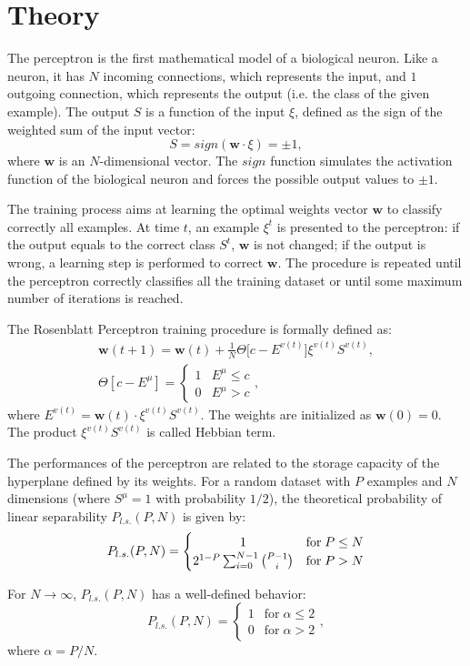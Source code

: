 \section{Theory}
\label{sec:fundamentals}

The perceptron is the first mathematical model of a biological neuron.
Like a neuron, it has $N$ incoming connections, which represents the input, and $1$ outgoing connection, which represents the output (i.e. the class of the given example).
The output $S$ is a function of the input $\xi$, defined as the sign of the weighted sum of the input vector:
\begin{equation}
    S = sign(\mathsf{\bm{w}} \cdotp \xi) = \pm 1,
    \label{eq:perceptron-activation}
\end{equation}
where $\mathsf{\bm{w}}$ is an $N$-dimensional vector.
The $sign$ function simulates the activation function of the biological neuron and forces the possible output values to $\pm 1$.

The training process aims at learning the optimal weights vector $\mathsf{\bm{w}}$ to classify correctly all examples.
At time $t$, an example $\xi^t$ is presented to the perceptron:
if the output equals to the correct class $S^t$, $\mathsf{\bm{w}}$ is not changed;
if the output is wrong, a learning step is performed to correct $\mathsf{\bm{w}}$.
The procedure is repeated until the perceptron correctly classifies all the training dataset or until some maximum number of iterations is reached.

The Rosenblatt Perceptron training procedure is formally defined as:
\begin{gather}
    \label{eq:perceptron-weight-update}
    \mathsf{\bm{w}}(t+1) = \mathsf{\bm{w}}(t) + \frac{1}{N} \Theta \big[c - E^{v(t)}\big] \xi^{v(t)} S^{v(t)}, \\
    \Theta[c - E^{\mu}] =  \begin{cases} \label{eq:heaviside-fun}
        1 & E^{\mu} \leq c \\
        0 & E^{\mu} > c
    \end{cases},
\end{gather}
where $E^{v(t)} = \mathsf{\bm{w}}(t) \cdot \xi^{v(t)} S^{v(t)}$.
The weights are initialized as $\mathsf{\bm{w}}(0) = 0$.
The product $\xi^{v(t)} S^{v(t)}$ is called Hebbian term.

The performances of the perceptron are related to the storage capacity of the hyperplane defined by its weights.
For a random dataset with $P$ examples and $N$ dimensions (where $S^\mu = 1$ with probability $1/2$), the theoretical probability of linear separability $P_{l.s.}(P,N)$ is given by:
\begin{equation}
    P_{l.s.}(P,N) =
    \begin{cases}
        \hfil 1 & \text{for} \; P \leq N \\
        2^{1-P} \sum^{N-1}_{i=0} \binom{P - 1}{i} & \text{for} \; P > N       
    \end{cases}
    \label{eq:prob-lin-sep}
\end{equation}

For $N \rightarrow \infty$, $P_{l.s.}(P,N)$ has a well-defined behavior:
\begin{equation} \label{eq:prob-lin-sep-alpha}
    P_{l.s.}(P,N) =
    \begin{cases}
        1 & \text{for} \; \alpha \leq 2 \\
        0 & \text{for} \; \alpha > 2
    \end{cases},
\end{equation}
where $\alpha = P / N$.
